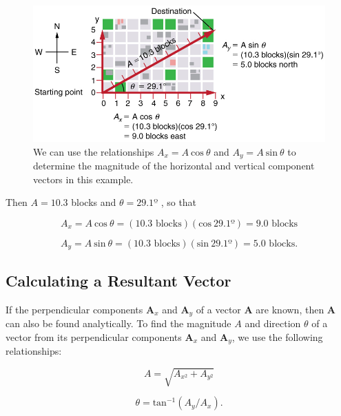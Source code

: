 \documentclass[
]{book}
\begin{document}
\begin{figure}
\hypertarget{import-auto-id1165298544262}{%
\centering
\includegraphics{images/Figure_03_03_03.jpg}
\caption{We can use the relationships \({{A_{x} = A}\ \text{cos}\ \theta}{}\) and
\({{A_{y} = A\ }\text{sin}\ \theta}{}\) to determine the magnitude of the
horizontal and vertical component vectors in this
example.}\label{import-auto-id1165298544262}
}
\end{figure}

Then \({A = 10.3}{}\) blocks and \(\theta = 29.1º\) , so that

\leavevmode{}%
\[A_{x} = A\ \text{cos}\ \theta = \left( \text{10.3\ blocks} \right)\left( \text{cos}\ 29.1º \right) = \text{9.0\ blocks}\]

\leavevmode{}%
\[{A_{y} = A\ \text{sin}\ \theta = \left( \text{10.3\ blocks} \right)\left( \text{sin}\ 29.1º \right) = \text{5.0\ blocks}}\text{.}\]

\hypertarget{fs-id1344575}{}
\hypertarget{calculating-a-resultant-vector}{%
\subsection{Calculating a Resultant Vector}\label{calculating-a-resultant-vector}}

If the perpendicular components \(\mathbf{A}_{x}{}\) and
\(\mathbf{A}_{y}{}\) of a vector \(\mathbf{A}{}\) are known, then
\(\mathbf{A}{}\) can also be found analytically. To find the magnitude
\(A{}\) and direction \(\theta{}\) of a vector from its perpendicular
components \(\mathbf{A}_{x}{}\) and \(\mathbf{A}_{y}{}\), we use the
following relationships:

\leavevmode{}%
\[{A = \sqrt{A_{x^{2}} + A_{y^{2}}}}{}\]

\leavevmode{}%
\[{{\theta = \text{tan}^{- 1}}({A_{y}/A_{x}})}\text{.}{}\]
\end{document}
